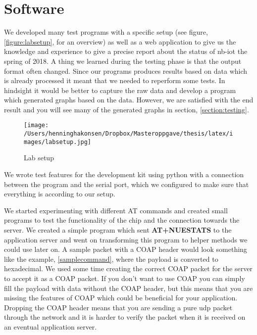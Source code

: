 \documentclass[USenglish]{ifimaster}  %
\begin{document}
\section{Software}
We developed many test programs with a specific setup (see figure, \vref{figure:labsetup}, for an overview) as well as a web application to give us the knowledge and experience to give a precise report about the status of \acrshort{nb-iot} the spring of 2018. A thing we learned during the testing phase is that the output format often changed. Since our programs produces results based on data which is already processed it meant that we needed to reperform some tests. In hindsight it would be better to capture the raw data and develop a program which generated graphs based on the data. However, we are satisfied with the end result and you will see many of the generated graphs in section, \vref{section:testing}.

\begin{figure}[ht]
  \centering\texttt{[image: /Users/henninghakonsen/Dropbox/Masteroppgave/thesis/latex/images/labsetup.jpg]}
  \caption[Lab setup overview]{Lab setup \cite{pcpng35052:online} \cite{fluke88435:online} \cite{ingagrue31:online}}
  \label{figure:labsetup}
\end{figure}

We wrote test features for the development kit using python with a connection between the program and the serial port, which we configured to make sure that everything is according to our setup.

We started experimenting with different AT commands and created small programs to test the functionality of the chip and the connection towards the server. We created a simple program which sent \textbf{AT+NUESTATS} to the application server and went on transforming this program to helper methods we could use later on. A sample packet with a COAP header would look something like the example, \vref{samplecommand}, where the payload is converted to hexadecimal. We used some time creating the correct COAP packet for the server to accept it as a COAP packet. If you don't want to use COAP you can simply fill the payload with data without the COAP header, but this means that you are missing the features of COAP which could be beneficial for your application. Dropping the COAP header means that you are sending a pure \acrshort{udp} packet through the network and it is harder to verify the packet when it is received on an eventual application server.
\end{document}
